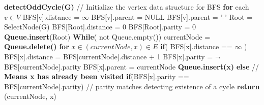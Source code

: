 \documentclass{article}
\begin{document}
  \newline
  \textbf {detectOddCycle(G)} \newline
  \hspace*{0.5cm} // Initialize the vertex data structure for BFS \newline
  \hspace*{0.5cm} \textbf {for} each $v \in V$ \newline
  \hspace*{1.0cm}	BFS[v].distance = $\infty$ \newline
  \hspace*{1.0cm}	BFS[v].parent = NULL \newline
  \hspace*{1.0cm}	BFS[v].parent = '-' \newline
  \hspace*{0.5cm} Root = SelectNode(G) \newline
  \hspace*{0.5cm} BFS[Root].distance = 0 \newline
  \hspace*{0.5cm} BFS[Root].parity   = 0 \newline
  \hspace*{0.5cm} \textbf {Queue.insert}(Root) \newline
  \hspace*{0.5cm} \textbf {While}( not Queue.empty())  \newline
  \hspace*{1.0cm}	currentNode = \textbf {Queue.delete()} \newline
  \hspace*{1.0cm}	\textbf {for} $x \in {(currentNode, x) \in E}$ \newline
  \hspace*{1.5cm}		\textbf {if}( BFS[x].distance == $\infty$ ) \newline
  \hspace*{2.0cm}			BFS[x].distance = BFS[currentNode].distance + 1 \newline
  \hspace*{2.0cm}			BFS[x].parity = $\neg$BFS[currentNode].parity \newline
  \hspace*{2.0cm}			BFS[x].parent = currentNode \newline
  \hspace*{2.0cm}			\textbf {Queue.insert(x)} \newline
  \hspace*{1.5cm}		\textbf {else} // \textbf {Means x has already been visited} \newline
  \hspace*{2.0cm}			\textbf {if}(BFS[x].parity == BFS[currentNode].parity) // parity matches detecting existence of a cycle \newline
  \hspace*{2.5cm}				\textbf {return} (currentNode, x) \newline
\newline
  
\end{document}
